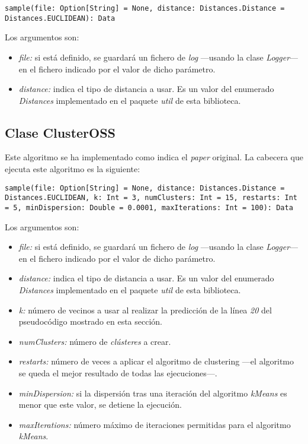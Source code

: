 \begin{lstlisting}[frame=single, basicstyle=\scriptsize, breaklines=true]
sample(file: Option[String] = None, distance: Distances.Distance = Distances.EUCLIDEAN): Data
\end{lstlisting}

Los argumentos son:

\begin{itemize}
    \item \textit{file:} si está definido, se guardará un fichero de \textit{log} —usando la clase \textit{Logger}— en el fichero indicado por el valor de dicho parámetro.
    \item \textit{distance:} indica el tipo de distancia a usar. Es un valor del enumerado \textit{Distances} implementado en el paquete \textit{util} de esta biblioteca.
\end{itemize}

\subsection{Clase ClusterOSS} \label{subsec:impl_clusteross}

Este algoritmo se ha implementado como indica el \textit{paper} original. La cabecera que ejecuta este algoritmo es la siguiente:

\begin{lstlisting}[frame=single, basicstyle=\scriptsize, breaklines=true]
sample(file: Option[String] = None, distance: Distances.Distance = Distances.EUCLIDEAN, k: Int = 3, numClusters: Int = 15, restarts: Int = 5, minDispersion: Double = 0.0001, maxIterations: Int = 100): Data
\end{lstlisting}

Los argumentos son:

\begin{itemize}
    \item \textit{file:} si está definido, se guardará un fichero de \textit{log} —usando la clase \textit{Logger}— en el fichero indicado por el valor de dicho parámetro.
    \item \textit{distance:} indica el tipo de distancia a usar. Es un valor del enumerado \textit{Distances} implementado en el paquete \textit{util} de esta biblioteca.
    \item \textit{k:} número de vecinos a usar al realizar la predicción de la línea \textit{20} del pseudocódigo mostrado en esta sección.
    \item \textit{numClusters:} número de \textit{clústeres} a crear.
    \item \textit{restarts:} número de veces a aplicar el algoritmo de clustering —el algoritmo se queda el mejor resultado de todas las ejecuciones—.
    \item \textit{minDispersion:} si la dispersión tras una iteración del algoritmo \textit{kMeans} \cite{kmeans} es menor que este valor, se detiene la ejecución.
    \item \textit{maxIterations:} número máximo de iteraciones permitidas para el algoritmo \textit{kMeans}.
\end{itemize}

